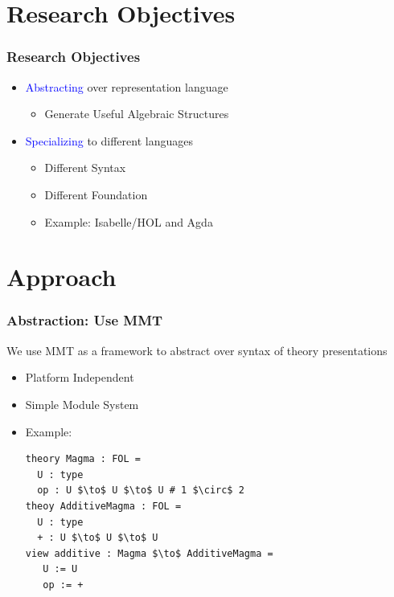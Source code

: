 \documentclass[t,12pt,numbers,fleqn,usenames,xcolor=dvipsnames]{beamer}
\begin{document}
\section{Research Objectives}
\begin{frame}
\frametitle{Research Objectives}
\begin{itemize}
	\item \textcolor{blue}{Abstracting} over representation language 
	\begin{itemize}
		\item Generate Useful Algebraic Structures 
	\end{itemize}
	\item \textcolor{blue}{Specializing} to different languages
	  \begin{itemize}
	  	\item Different Syntax
	  	\item Different Foundation 
	  	\item Example: Isabelle/HOL and Agda 
	  \end{itemize}
\end{itemize}
\end{frame}

\section{Approach}
\begin{frame}[fragile]
\frametitle{Abstraction: Use MMT}
We use MMT as a framework to abstract over syntax of theory presentations 
\begin{itemize}
	\item Platform Independent 
	\item Simple Module System
	\item Example: 
\scriptsize	
	\begin{lstlisting}
theory Magma : FOL = 
  U : type
  op : U $\to$ U $\to$ U # 1 $\circ$ 2
theoy AdditiveMagma : FOL = 
  U : type
  + : U $\to$ U $\to$ U 
view additive : Magma $\to$ AdditiveMagma = 
   U := U 
   op := +   
	\end{lstlisting}
\end{itemize}
\end{frame}

\end{document}
